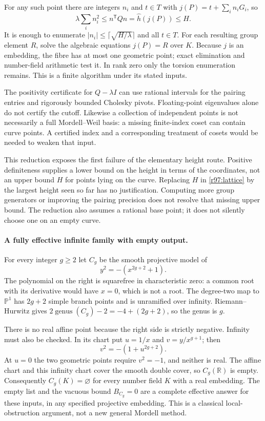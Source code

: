 \documentclass[11pt]{article}
\begin{document}
For any such point there are integers $n_i$ and $t\in T$ with
$j(P)=t+\sum_i n_iG_i$, so
\begin{equation}\label{r97:lattice}
 \lambda\sum_i n_i^2\le n^{\mathsf T}Qn
       =\widehat h(j(P))\le H.
\end{equation}
It is enough to enumerate $|n_i|\le\lceil\sqrt{H/\lambda}\rceil$
and all $t\in T$. For each resulting group element $R$, solve the
algebraic equations $j(P)=R$ over $K$. Because $j$ is an embedding,
the fibre has at most one geometric point; exact elimination and
number-field arithmetic test it. In rank zero only the torsion
enumeration remains. This is a finite algorithm under its stated
inputs.

The positivity certificate for $Q-\lambda I$ can use rational
intervals for the pairing entries and rigorously bounded Cholesky
pivots. Floating-point eigenvalues alone do not certify the cutoff.
Likewise a collection of independent points is not necessarily a full
Mordell--Weil basis: a missing finite-index coset can contain curve
points. A certified index and a corresponding treatment of cosets
would be needed to weaken that input.

This reduction exposes the first failure of the elementary height
route. Positive definiteness supplies a lower bound on the height in
terms of the coordinates, not an upper bound $H$ for points lying on
the curve. Replacing $H$ in \eqref{r97:lattice} by the largest height
seen so far has no justification. Computing more group generators or
improving the pairing precision does not resolve that missing upper
bound. The reduction also assumes a rational base point; it does not
silently choose one on an empty curve.

\paragraph{A fully effective infinite family with empty output.}
For every integer $g\ge2$ let $C_g$ be the smooth projective model of
\[
                        y^2=-(x^{2g+2}+1).
\]
The polynomial on the right is squarefree in characteristic zero:
a common root with its derivative would have $x=0$, which is not a
root. The degree-two map to $\mathbb P^1$ has $2g+2$ simple branch
points and is unramified over infinity. Riemann--Hurwitz gives
$2\operatorname{genus}(C_g)-2=-4+(2g+2)$, so the genus is $g$.

There is no real affine point because the right side is strictly
negative. Infinity must also be checked. In its chart put $u=1/x$
and $v=y/x^{g+1}$; then
\[
                       v^2=-(1+u^{2g+2}).
\]
At $u=0$ the two geometric points require $v^2=-1$, and neither is
real. The affine chart and this infinity chart cover the smooth
double cover, so $C_g(\mathbb R)$ is empty. Consequently
$C_g(K)=\varnothing$ for every number field $K$ with a real embedding.
The empty list and the vacuous bound $B_{C_g}=0$ are a complete
effective answer for these inputs, in any specified projective
embedding. This is a classical local-obstruction argument, not a
new general Mordell method.
\end{document}
